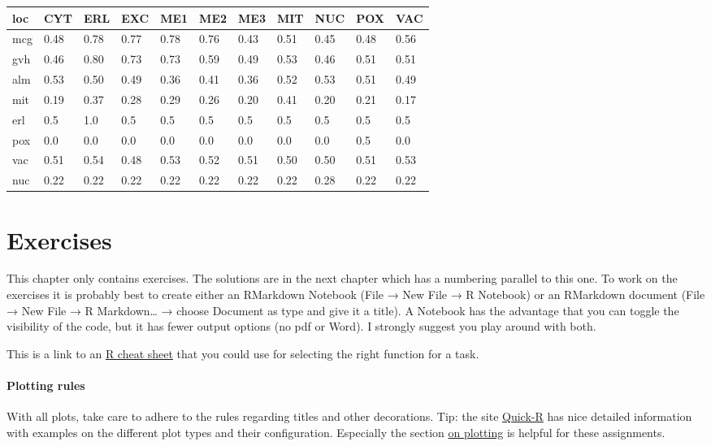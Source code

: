 \documentclass[]{book}
\begin{document}
\begin{tabular}{l|l|l|l|l|l|l|l|l|l|l}
\hline
loc & CYT & ERL & EXC & ME1 & ME2 & ME3 & MIT & NUC & POX & VAC\\
\hline
mcg & 0.48 & 0.78 & 0.77 & 0.78 & 0.76 & 0.43 & 0.51 & 0.45 & 0.48 & 0.56\\
\hline
gvh & 0.46 & 0.80 & 0.73 & 0.73 & 0.59 & 0.49 & 0.53 & 0.46 & 0.51 & 0.51\\
\hline
alm & 0.53 & 0.50 & 0.49 & 0.36 & 0.41 & 0.36 & 0.52 & 0.53 & 0.51 & 0.49\\
\hline
mit & 0.19 & 0.37 & 0.28 & 0.29 & 0.26 & 0.20 & 0.41 & 0.20 & 0.21 & 0.17\\
\hline
erl & 0.5 & 1.0 & 0.5 & 0.5 & 0.5 & 0.5 & 0.5 & 0.5 & 0.5 & 0.5\\
\hline
pox & 0.0 & 0.0 & 0.0 & 0.0 & 0.0 & 0.0 & 0.0 & 0.0 & 0.5 & 0.0\\
\hline
vac & 0.51 & 0.54 & 0.48 & 0.53 & 0.52 & 0.51 & 0.50 & 0.50 & 0.51 & 0.53\\
\hline
nuc & 0.22 & 0.22 & 0.22 & 0.22 & 0.22 & 0.22 & 0.22 & 0.28 & 0.22 & 0.22\\
\hline
\end{tabular}

\hypertarget{exercises}{%
\chapter{Exercises}\label{exercises}}

This chapter only contains exercises. The solutions are in the next chapter which has a numbering parallel to this one. To work on the exercises it is probably best to create either an RMarkdown Notebook (File → New File → R Notebook) or an RMarkdown document (File → New File → R Markdown\ldots{} → choose Document as type and give it a title). A Notebook has the advantage that you can toggle the visibility of the code, but it has fewer output options (no pdf or Word). I strongly suggest you play around with both.

This is a link to an \href{figures/R_cheatsheet.pdf}{R cheat sheet} that you could use for selecting the right function for a task.

\hypertarget{plotting-rules}{%
\subsubsection*{Plotting rules}\label{plotting-rules}}

With all plots, take care to adhere to the rules regarding titles and other decorations. Tip: the site \href{http://www.statmethods.net/}{Quick-R} has nice detailed information with examples on the different plot types and their configuration. Especially the section \href{http://www.statmethods.net/graphs/index.html}{on plotting} is helpful for these assignments.
\end{document}
